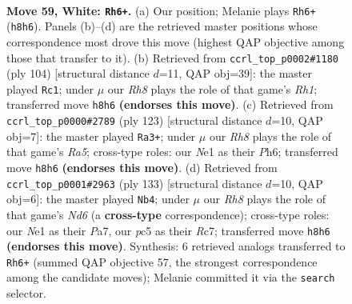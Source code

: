 \documentclass[11pt]{article}
\begin{document}
\clearpage

\begin{figure}[p]\centering
\begin{subfigure}{0.46\textwidth}\centering
\resizebox{\linewidth}{!}{%
\newchessgame
\chessboard[
  setfen={7R/8/4k3/2p4P/8/8/1P6/3KNr2 w - - 0 59},
  showmover=false,
  pgfstyle=straightmove, color=movearrow, markmove={h8-h6}
]}
\caption{}
\end{subfigure}\hfill
\begin{subfigure}{0.46\textwidth}\centering
\resizebox{\linewidth}{!}{%
\newchessgame
\chessboard[
  setfen={6k1/8/6p1/4n3/8/1rN1K1PP/8/7R w - - 3 53},
  showmover=false,
  pgfstyle=straightmove, color=movearrow, markmove={h1-c1}
]}
\caption{}
\end{subfigure}
\\[4pt]
\begin{subfigure}{0.46\textwidth}\centering
\resizebox{\linewidth}{!}{%
\newchessgame
\chessboard[
  setfen={8/7R/p2k3p/7P/r7/6K1/8/8 b - - 5 62},
  showmover=false,
  pgfstyle=straightmove, color=movearrow, markmove={a4-a3}
]}
\caption{}
\end{subfigure}\hfill
\begin{subfigure}{0.46\textwidth}\centering
\resizebox{\linewidth}{!}{%
\newchessgame
\chessboard[
  setfen={4k3/p1r5/R7/3B1P2/7K/3n4/8/8 b - - 0 67},
  showmover=false,
  pgfstyle=straightmove, color=movearrow, markmove={d3-b4}
]}
\caption{}
\end{subfigure}
\caption{\textbf{Move 59, White: \texttt{Rh6+}.} (a) Our position; Melanie plays \texttt{Rh6+} (\texttt{h8h6}). Panels (b)--(d) are the retrieved master positions whose correspondence most drove this move (highest QAP objective among those that transfer to it). (b) Retrieved from \texttt{ccrl\_top\_p0002\#1180} (ply 104) [structural distance $d$=11, QAP obj=39]: the master played \texttt{Rc1}; under $\mu$ our \emph{Rh8} plays the role of that game's \emph{Rh1}; transferred move \texttt{h8h6} \textbf{(endorses this move)}. (c) Retrieved from \texttt{ccrl\_top\_p0000\#2789} (ply 123) [structural distance $d$=10, QAP obj=7]: the master played \texttt{Ra3+}; under $\mu$ our \emph{Rh8} plays the role of that game's \emph{Ra5}; cross-type roles: our \emph{N}e1 as their \emph{P}h6; transferred move \texttt{h8h6} \textbf{(endorses this move)}. (d) Retrieved from \texttt{ccrl\_top\_p0001\#2963} (ply 133) [structural distance $d$=10, QAP obj=6]: the master played \texttt{Nb4}; under $\mu$ our \emph{Rh8} plays the role of that game's \emph{Nd6} (a \textbf{cross-type} correspondence); cross-type roles: our \emph{N}e1 as their \emph{P}a7, our \emph{p}c5 as their \emph{R}c7; transferred move \texttt{h8h6} \textbf{(endorses this move)}. Synthesis: 6 retrieved analogs transferred to \texttt{Rh6+} (summed QAP objective 57, the strongest correspondence among the candidate moves); Melanie committed it via the \texttt{search} selector.}
\label{fig:thought-m116}
\end{figure}
\end{document}
